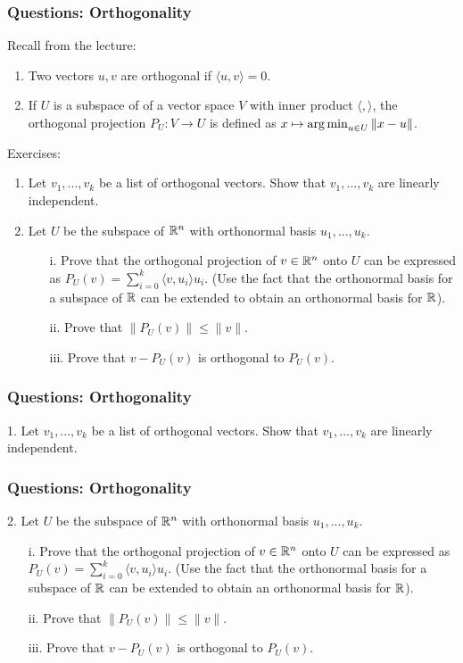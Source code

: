 \documentclass{beamer}
\begin{document}
\begin{frame}[t]
\frametitle{Questions: Orthogonality}
Recall from the lecture:
\begin{enumerate}
\item Two vectors $u,v$ are orthogonal if $\langle u, v \rangle = 0$.
\item If $U$ is a subspace of of a vector space $V$ with inner product $\langle , \rangle$, the orthogonal projection $P_{U} : V \rightarrow U$ is defined as $x \mapsto \operatorname*{arg\,min}_{u \in U} \|x-u\|$.
\end{enumerate}
Exercises:
\begin{enumerate}
\item Let $v_1,...,v_k$ be a list of orthogonal vectors. Show that $v_1,...,v_k$ are linearly independent.
\item Let $U$ be the subspace of $\mathbb{R}^n$ with orthonormal basis $u_1,...,u_k$.
\begin{enumerate}
 \item[i.] Prove that the orthogonal projection of $v \in \mathbb{R}^n$ onto $U$ can be expressed as $P_U (v) = \sum_{i=0}^k  \langle v,u_i \rangle u_i$. (Use the fact that the orthonormal basis for a subspace of $\mathbb{R}$ can be extended to obtain an orthonormal basis for $\mathbb{R}$).
 \item[ii.] Prove that $\|P_U(v)\| \leq \|v\|$.
 \item[iii.] Prove that $v-P_U(v)$ is orthogonal to $P_U(v)$.
\end{enumerate}
\end{enumerate}
\end{frame}

\begin{frame}[t]
\frametitle{Questions: Orthogonality}
1. Let $v_1,...,v_k$ be a list of orthogonal vectors. Show that $v_1,...,v_k$ are linearly independent.
\pause
\end{frame}

\begin{frame}[t]
\frametitle{Questions: Orthogonality}
2. Let $U$ be the subspace of $\mathbb{R}^n$ with orthonormal basis $u_1,...,u_k$.
\begin{enumerate}
 \item[i.] Prove that the orthogonal projection of $v \in \mathbb{R}^n$ onto $U$ can be expressed as $P_U(v)  = \sum_{i=0}^k  \langle v,u_i \rangle u_i$. (Use the fact that the orthonormal basis for a subspace of $\mathbb{R}$ can be extended to obtain an orthonormal basis for $\mathbb{R}$).
 \item[ii.] Prove that $\|P_U(v)\| \leq \|v\|$.
 \item[iii.] Prove that $v-P_U(v)$ is orthogonal to $P_U(v)$.
 \end{enumerate}
\pause
\pause
\pause
\pause
\end{frame}
\end{document}

